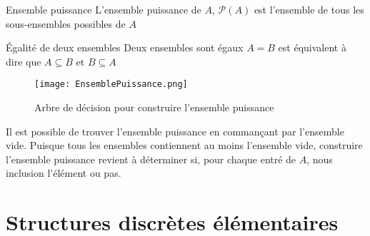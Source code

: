 \documentclass[8pt]{report}
\begin{document}
\begin{multicols*}{2}
\begin{note}{}{}
\end{note}



\begin{Definition}{Ensemble puissance}{}
  L'ensemble puissance de $A$, $\mathcal{P}\left(A\right)$ est l'ensemble de tous les sous-ensembles possibles de $A$
\end{Definition}




\begin{Remarque}{Égalité de deux ensembles}{}
    Deux ensembles sont égaux $A = B$ est équivalent à dire que $A \subseteq B$ et  
    $B \subseteq A$ 
  \end{Remarque}

  \begin{figure}[H]
    \begin{center}
        \texttt{[image: EnsemblePuissance.png]}
    \end{center}
    \caption{Arbre de décision pour construire l'ensemble puissance}
\end{figure}

Il est possible de trouver l'ensemble puissance en commançant par l'ensemble vide. Puisque tous les ensembles 
contiennent au moins l'ensemble vide, construire l'ensemble puissance revient à déterminer si, pour 
chaque entré de $A$, nous inclusion l'élément ou pas. 

\chapter{Structures  discrètes élémentaires}


\end{multicols*}
\end{document}
